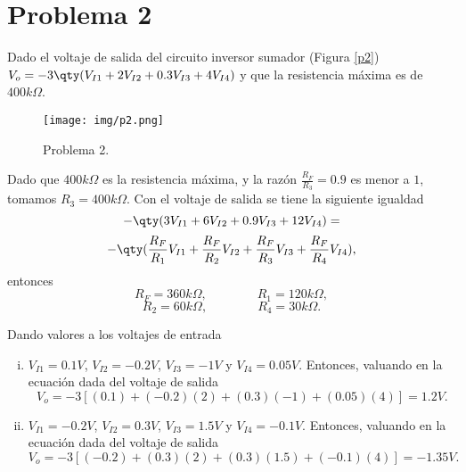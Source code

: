 \documentclass[conference]{IEEEtran}
\begin{document}
\section{Problema 2}
Dado el voltaje de salida del circuito inversor sumador (Figura \ref{p2}) $ V_o = -3 \qty( V_{I1} + 2V_{I2} + 0.3V_{I3} + 4V_{I4} ) $ y que la resistencia máxima es de $400k\Omega$.

\begin{figure}[H]
	\centering
	\texttt{[image: img/p2.png]}
	\caption{Problema 2.}
	\label{p2e}
\end{figure}

Dado que $400k\Omega$ es la resistencia máxima, y la razón $\frac{R_F}{R_3} = 0.9$ es menor a $1$, tomamos $\boxed{ R_3 = 400k\Omega }$. Con el voltaje de salida se tiene la siguiente igualdad
	$$ -\qty( 3V_{I1} + 6V_{I2} + 0.9V_{I3} + 12V_{I4} ) =  $$
	$$ -\qty(\frac{R_F}{R_1} V_{I1} + \frac{R_F}{R_2} V_{I2} + \frac{R_F}{R_3} V_{I3} + \frac{R_F}{R_4} V_{I4} ), $$
entonces
	$$ \boxed{ R_F = 360k\Omega , } \qquad \qquad \boxed{ R_1 = 120k\Omega , } $$
	$$ \boxed{ R_2 = 60k\Omega , } \qquad \qquad \boxed{ R_4 = 30k\Omega . } $$

Dando valores a los voltajes de entrada
\begin{enumerate}[i)]
	\item $V_{I1} = 0.1V$, $V_{I2} = -0.2V$, $V_{I3} = -1V$ y $V_{I4} = 0.05V$. Entonces, valuando en la ecuación dada del voltaje de salida
		$$ V_o = -3[(0.1) + (-0.2)(2) + (0.3)(-1) + (0.05)(4)] = \boxed{ 1.2V. } $$
	\item $V_{I1} = -0.2V$, $V_{I2} = 0.3V$, $V_{I3} = 1.5V$ y $V_{I4} = -0.1V$. Entonces, valuando en la ecuación dada del voltaje de salida
		$$ V_o = -3[(-0.2) + (0.3)(2) + (0.3)(1.5) + (-0.1)(4)] = \boxed{ -1.35V. } $$
\end{enumerate}
\vspace{0.3cm}
\end{document}
